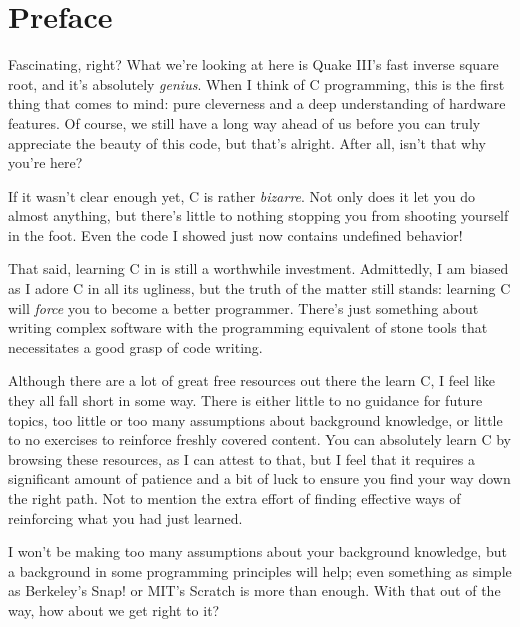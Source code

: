 %

\chapter{Preface}


\noindent
Fascinating, right?  What we're looking at here is Quake III's fast
inverse square root, and it's
absolutely \emph{genius}.  When I think of C programming, this is the
first thing that comes to mind: pure cleverness and a deep understanding
of hardware features.  Of course, we still have a long way ahead of us
before you can truly appreciate the beauty of this code, but that's
alright.  After all, isn't that why you're here?

If it wasn't clear enough yet, C is rather \emph{bizarre}.  Not only
does it let you do almost anything, but there's little to nothing
stopping you from shooting yourself in the foot.  Even the code I showed
just now contains undefined behavior!

That said, learning C in  is still a
worthwhile investment.  Admittedly, I am biased as I adore C in all its
ugliness, but the truth of the matter still stands: learning C will
\emph{force} you to become a better programmer.  There's just something
about writing complex software with the programming equivalent of stone
tools that necessitates a good grasp of code writing.

Although there are a lot of great free resources out there the learn C,
I feel like they all fall short in some way.  There is either little to
no guidance for future topics, too little or too many assumptions about
background knowledge, or little to no exercises to reinforce freshly
covered content.  You can absolutely learn C by browsing these
resources, as I can attest to that, but I feel that it requires a
significant amount of patience and a bit of luck to ensure you find your
way down the right path.  Not to mention the extra effort of finding
effective ways of reinforcing what you had just learned.

I won't be making too many assumptions about your background knowledge,
but a background in some programming principles will help; even
something as simple as Berkeley's Snap! or MIT's Scratch
is more than enough.  With that out of the way, how about we get right
to it?
